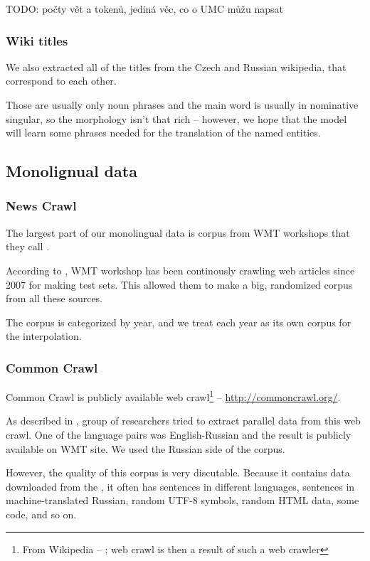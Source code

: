 TODO: počty vět a tokenů, jediná věc, co o UMC můžu napsat

\subsubsection{Wiki titles}
We also extracted all of the titles from the Czech and Russian wikipedia, that correspond to each other.

Those are usually only noun phrases and the main word is usually in nominative singular, so the morphology isn't that rich -- however, we hope that the model will learn some phrases needed for the translation of the named entities.

\subsection{Monolignual data}
\subsubsection{News Crawl}
The largest part of our monolingual data is corpus from WMT workshops that they call .

According to \cite{wmt_findings_2009}, WMT workshop has been continously crawling web articles since 2007 for making test sets. This allowed them to make a big, randomized corpus from all these sources.

The corpus is categorized by year, and we treat each year as its own corpus for the interpolation.
\subsubsection{Common Crawl}
Common Crawl is publicly available web crawl\footnote{From Wikipedia -- ; web crawl is then a result of such a web crawler} -- \url{http://commoncrawl.org/}.

As described in \cite{commoncrawl}, group of researchers tried to extract parallel data from this web crawl. One of the language pairs was English-Russian and the result is publicly available on WMT site. We used the Russian side of the corpus.

However, the quality of this corpus is very discutable. Because it contains data downloaded from the , it often has sentences in different languages, sentences in machine-translated Russian, random UTF-8 symbols, random HTML data, some code, and so on.

